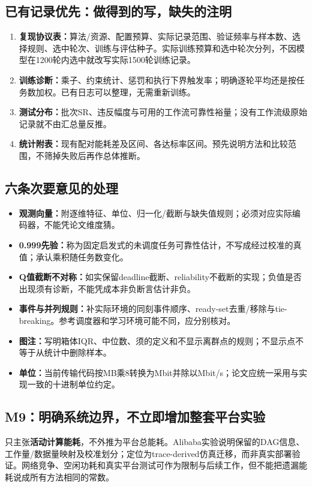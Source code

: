 \documentclass[UTF8,11pt,a4paper,fontset=fandol]{ctexart}
\begin{document}
\subsection*{已有记录优先：做得到的写，缺失的注明}
\begin{enumerate}
\item \textbf{复现协议表：}算法/资源、配置预算、实际记录范围、验证频率与样本数、选择规则、选中轮次、训练与评估种子。实际训练预算和选中轮次分列，不因模型在1200轮内选中就改写实际1500轮训练记录。
\item \textbf{训练诊断：}乘子、约束统计、惩罚和执行下界触发率；明确逐轮平均还是按任务数加权。已有日志可以整理，无需重新训练。
\item \textbf{测试分布：}批次SR、违反幅度与可用的工作流可靠性裕量；没有工作流级原始记录就不由汇总量反推。
\item \textbf{统计附表：}现有配对能耗差及区间、各达标率区间。预先说明方法和比较范围，不筛掉失败后再作总体推断。
\end{enumerate}

\subsection*{六条次要意见的处理}
\begin{itemize}
\item \textbf{观测向量：}附逐维特征、单位、归一化/截断与缺失值规则；必须对应实际编码器，不能凭论文维度猜。
\item \textbf{0.999先验：}称为固定启发式的未调度任务可靠性估计，不写成经过校准的真值；承认乘积随任务数变化。
\item \textbf{Q值截断不对称：}如实保留deadline截断、reliability不截断的实现；负值是否出现须有诊断，不能凭成本非负断言估计非负。
\item \textbf{事件与并列规则：}补实际环境的同刻事件顺序、ready-set去重/移除与tie-breaking。参考调度器和学习环境可能不同，应分别核对。
\item \textbf{图注：}写明箱体IQR、中位数、须的定义和不显示离群点的规则；不显示点不等于从统计中删除样本。
\item \textbf{单位：}当前传输代码按MB乘8转换为Mbit并除以Mbit/s；论文应统一采用与实现一致的十进制单位约定。
\end{itemize}

\subsection*{M9：明确系统边界，不立即增加整套平台实验}
只主张\textbf{活动计算能耗}，不外推为平台总能耗。Alibaba实验说明保留的DAG信息、工作量/数据量映射及校准划分；定位为trace-derived仿真迁移，而非真实部署验证。网络竞争、空闲功耗和真实平台测试可作为限制与后续工作，但不能把遗漏能耗说成所有方法相同的常数。
\end{document}

